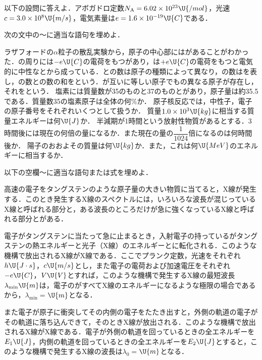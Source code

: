 
\hspace{1zw}以下の設問に答えよ．アボガドロ定数$N_{\mathrm{A}}=6.02\times 10^{23}\U{/mol}$，光速$c=3.0\times 10^8\U{m/s}$，電気素量は$e=1.6\times 10^{-19}\U{C}$である．
\begin{komon}
 次の文中の〜に適当な語句を埋めよ．\par
       ラザフォードの$\alpha$粒子の散乱実験から，原子の中心部にはがあることがわかった．の周りには$-e\U{C}$の電荷をもつがあり，は$+e\U{C}$の電荷をもつと電気的に中性なとから成っている．との数は原子の種類によって異なり，の数はを表し，の数との数の和をという．が互いに等しい原子でもの異なる原子が存在し，それをという．
 塩素には質量数が35のものと37のものとがあり，原子量は約35.5である．質量数35の塩素原子は全体の何\%か．
 原子核反応では，中性子，電子の原子番号をそれぞれいくつとして扱うか．
 質量$1.0\times 10^3\U{kg}$に相当する質量エネルギーは何$\U{J}$か．
 半減期が1時間という放射性物質があるとする．3時間後には現在の何倍の量になるか．また現在の量の$\dfrac{1}{1024}$倍になるのは何時間後か．
 陽子のおおよその質量は何$\U{kg}$か．また，これは何$\U{MeV}$のエネルギーに相当するか．
\end{komon}

\filbreak
{}


\hspace{1zw}以下の空欄〜に適当な語句または式を埋めよ．
\par
\hspace{1zw}高速の電子をタングステンのような原子量の大きい物質に当てると，X線が発生する．このとき発生するX線のスペクトルには，いろいろな波長が混じっているX線と呼ばれる部分と，ある波長のところだけが急に強くなっているX線と呼ばれる部分とがある．
\par
\hspace{1zw}電子がタングステンに当たって急に止まるとき，入射電子の持っているがタングステンの熱エネルギーと光子（X線）のエネルギーとに転化される．このような機構で放出されるX線がX線である．ここでプランク定数，光速をそれぞれ$h\U{J\cdot s}$，$c\U{m/s}$とし，また電子の電荷および加速電圧をそれぞれ$-e\U{C}$，$V\U{V}$とすれば，このような機構で発生するX線の最短波長$\lambda_{\min}\U{m}$は，電子のがすべてX線のエネルギーになるような極限の場合であるから，$\lambda_{\min}=$$\U{m}$となる．
\par
\hspace{1zw}また電子が原子に衝突してその内側の電子をたたき出すと，外側の軌道の電子がその軌道に落ち込んできて，そのときX線が放出される．このような機構で放出されるX線がX線である．電子が外側の軌道を回っているときの全エネルギーを$E_1\U{J}$，内側の軌道を回っているときの全エネルギーを$E_2\U{J}$とすると，このような機構で発生するX線の波長は$\lambda_0=$$\U{m}$となる．

